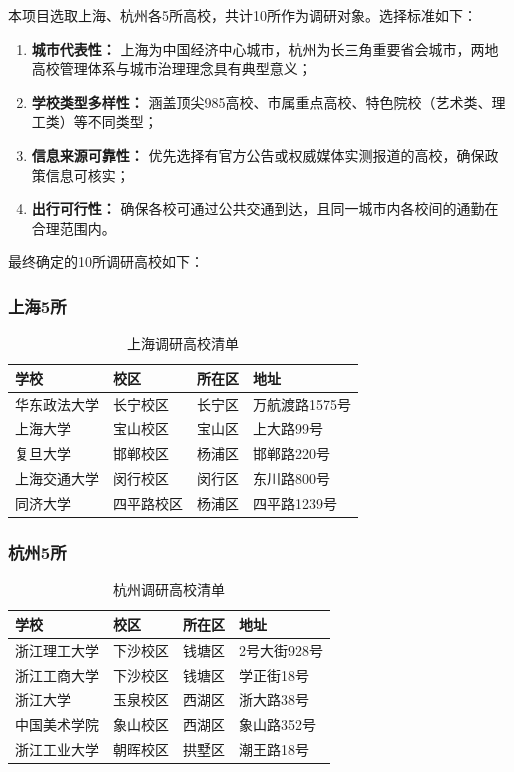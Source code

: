 \documentclass[12pt]{article}
\begin{document}
本项目选取上海、杭州各5所高校，共计10所作为调研对象。选择标准如下：

\begin{enumerate}[leftmargin=2em]
    \item \textbf{城市代表性：} 上海为中国经济中心城市，杭州为长三角重要省会城市，两地高校管理体系与城市治理理念具有典型意义；
    \item \textbf{学校类型多样性：} 涵盖顶尖985高校、市属重点高校、特色院校（艺术类、理工类）等不同类型；
    \item \textbf{信息来源可靠性：} 优先选择有官方公告或权威媒体实测报道的高校，确保政策信息可核实；
    \item \textbf{出行可行性：} 确保各校可通过公共交通到达，且同一城市内各校间的通勤在合理范围内。
\end{enumerate}

最终确定的10所调研高校如下：

\subsubsection*{上海5所}

\begin{table}[H]
\centering
\caption{上海调研高校清单}
\label{tab:shanghai-schools}
\begin{tabular}{p{2.8cm}p{3.5cm}p{2.8cm}p{3.5cm}}
\toprule
\textbf{学校} & \textbf{校区} & \textbf{所在区} & \textbf{地址} \\
\midrule
华东政法大学 & 长宁校区 & 长宁区 & 万航渡路1575号 \\
上海大学 & 宝山校区 & 宝山区 & 上大路99号 \\
复旦大学 & 邯郸校区 & 杨浦区 & 邯郸路220号 \\
上海交通大学 & 闵行校区 & 闵行区 & 东川路800号 \\
同济大学 & 四平路校区 & 杨浦区 & 四平路1239号 \\
\bottomrule
\end{tabular}
\end{table}

\subsubsection*{杭州5所}

\begin{table}[H]
\centering
\caption{杭州调研高校清单}
\label{tab:hangzhou-schools}
\begin{tabular}{p{3.2cm}p{3.5cm}p{2.6cm}p{3.5cm}}
\toprule
\textbf{学校} & \textbf{校区} & \textbf{所在区} & \textbf{地址} \\
\midrule
浙江理工大学 & 下沙校区 & 钱塘区 & 2号大街928号 \\
浙江工商大学 & 下沙校区 & 钱塘区 & 学正街18号 \\
浙江大学 & 玉泉校区 & 西湖区 & 浙大路38号 \\
中国美术学院 & 象山校区 & 西湖区 & 象山路352号 \\
浙江工业大学 & 朝晖校区 & 拱墅区 & 潮王路18号 \\
\bottomrule
\end{tabular}
\end{table}
\end{document}
